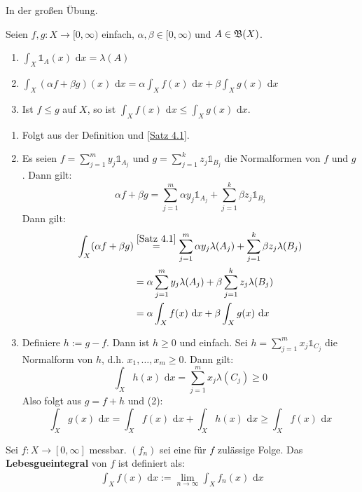 \documentclass[a4paper,twoside,DIV15,BCOR12mm,chapterprefix=true,headings=onelinechapter]{scrbook}
\begin{document}
\begin{beweis}
In der großen Übung.
\end{beweis}

\begin{satz}
\label{Satz 4.2}
Seien $f,g:X\to[0,\infty)$ einfach, $\alpha, \beta\in[0,\infty)$ und $A\in\mathfrak{B}(X)$.
\begin{enumerate}
\item $\int_X \mathds{1}_A(x)\text{ d}x=\lambda(A)$
\item $\int_X (\alpha f+\beta g)(x)\text{ d}x = \alpha\int_X f(x)\text{ d}x + \beta\int_X g(x)\text{ d}x$
\item Ist $f\le g$ auf $X$, so ist $\int_X f(x)\text{ d}x\le \int_X g(x)\text{ d}x$.
\end{enumerate}
\end{satz}

\begin{beweis}
\begin{enumerate}
\item Folgt aus der Definition und \ref{Satz 4.1}.
\item Es seien $f=\sum_{j=1}^m y_j \mathds{1}_{A_j}$ und $g=\sum_{j=1}^k z_j \mathds{1}_{B_j}$ die Normalformen von $f$ und $g$. Dann gilt:
\[\alpha f+ \beta g=\sum_{j=1}^m \alpha y_j\mathds{1}_{A_j}+\sum_{j=1}^k \beta z_j\mathds{1}_{B_j}\]
Dann gilt:
\begin{align*}
\int_X (\alpha f+\beta g) &\stackrel{\ref{Satz 4.1}}= \sum_{j=1}^m \alpha y_j \lambda(A_j) + \sum_{j=1}^k \beta z_j \lambda(B_j)\\
&= \alpha \sum_{j=1}^m y_j \lambda(A_j) + \beta \sum_{j=1}^k z_j \lambda(B_j)\\
&= \alpha \int_X f(x)\text{ d}x + \beta \int_X g(x)\text{ d}x
\end{align*}
\item Definiere $h:=g-f$. Dann ist $h\ge 0$ und einfach. Sei $h=\sum_{j=1}^m x_j\mathds{1}_{C_j}$ die Normalform von $h$, d.h. $x_1,\ldots,x_m\ge 0$. Dann gilt:
\[\int_X h(x)\text{ d}x = \sum_{j=1}^m x_j\lambda(C_j)\ge 0\]
Also folgt aus $g=f+h$ und (2):
\[\int_X g(x)\text{ d}x=\int_X f(x)\text{ d}x +\int_X h(x)\text{ d}x\ge \int_X f(x)\text{ d}x\]
\end{enumerate}
\end{beweis}

\begin{definition}
Sei $f:X\to[0,\infty]$ messbar. $(f_n)$ sei eine für $f$ zulässige Folge. Das \textbf{Lebesgueintegral} von $f$ ist definiert als:
\begin{align*}
\tag{$*$}\int_X f(x)\text{ d}x:=\lim_{n\to\infty}\int_X f_n(x)\text{ d}x
\end{align*}
\end{definition}
\end{document}
